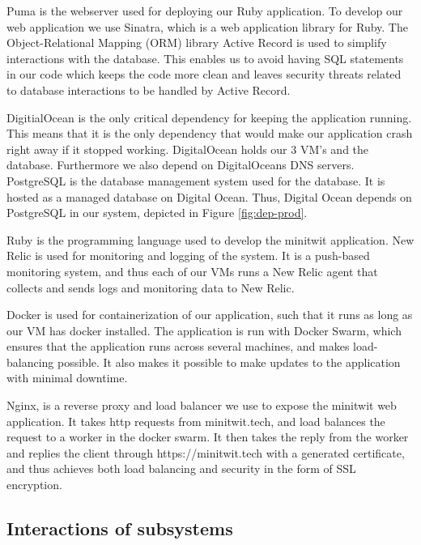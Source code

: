 \documentclass{article}
\begin{document}
Puma is the webserver used for deploying our Ruby application. 
To develop our web application we use Sinatra, which is a web application library for Ruby. 
The Object-Relational Mapping (ORM) library Active Record is used to simplify interactions with the database. This enables us to avoid having SQL statements in our code which keeps the code more clean and leaves security threats related to database interactions to be handled by Active Record. 

DigitialOcean is the only critical dependency for keeping the application running. This means that it is the only dependency that would make our application crash right away if it stopped working. DigitalOcean holds our 3 VM's and the database. Furthermore we also depend on DigitalOceans DNS servers. 
PostgreSQL is the database management system used for the database. It is hosted as a managed database on Digital Ocean. Thus, Digital Ocean depends on PostgreSQL in our system, depicted in Figure \ref{fig:dep-prod}.

Ruby is the programming language used to develop the minitwit application.
New Relic is used for monitoring and logging of the system. It is a push-based monitoring system, and thus each of our VMs runs a New Relic agent that collects and sends logs and monitoring data to New Relic.

Docker is used for containerization of our application, such that it runs as long as our VM has docker installed. The application is run with Docker Swarm, which ensures that the application runs across several machines, and makes load-balancing possible. It also makes it possible to make updates to the application with minimal downtime.

Nginx, is a reverse proxy and load balancer we use to expose the minitwit web application. It takes http requests from minitwit.tech, and load balances the request to a worker in the docker swarm. It then takes the reply from the worker and replies the client through https://minitwit.tech with a generated certificate, and thus achieves both load balancing and security in the form of SSL encryption.

\subsection{Interactions of subsystems}
\end{document}
